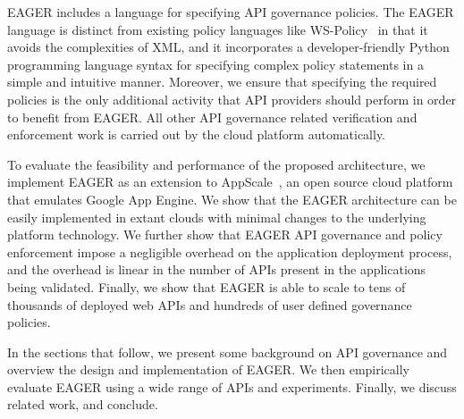 EAGER includes a language for specifying 
API governance policies.  The EAGER language is distinct from 
existing policy languages like WS-Policy~\cite{WSPolicy,soagovstandard}
in that it avoids the complexities of XML, 
and it incorporates a developer-friendly Python programming language syntax for 
specifying complex policy statements in a simple and 
intuitive manner. Moreover, we ensure that specifying the required policies 
is the only additional activity that API providers should perform in
order to benefit from EAGER. All other API governance related verification and 
enforcement work is carried out by the cloud platform automatically.

To evaluate the feasibility and performance of the proposed 
architecture, we implement EAGER as an extension to AppScale~\cite{appscale13}, 
an open source
cloud platform that emulates Google App Engine. We show that the EAGER 
architecture can be easily implemented in extant clouds with
minimal changes to the underlying platform technology. We further show that 
EAGER API governance and policy enforcement impose a negligible 
overhead on the application deployment process, and the overhead
is linear in the number of APIs present in the applications being validated.  
Finally, we show that EAGER is able to
scale to tens of thousands of deployed web APIs and hundreds of user 
defined governance policies.

In the sections that follow, we present some background on API governance
and overview the design and implementation of
EAGER. We then empirically evaluate EAGER using a wide range of APIs and
experiments.  Finally, we discuss related work, and conclude.

